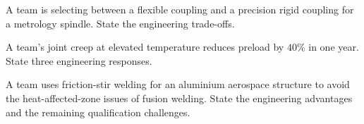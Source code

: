 \begin{exercise}
A team is selecting between a flexible coupling and a precision rigid coupling for a metrology spindle. State the engineering trade-offs.
\end{exercise}

\begin{exercise}
A team's joint creep at elevated temperature reduces preload by $40\%$ in one year. State three engineering responses.
\end{exercise}

\begin{exercise}
A team uses friction-stir welding for an aluminium aerospace structure to avoid the heat-affected-zone issues of fusion welding. State the engineering advantages and the remaining qualification challenges.
\end{exercise}
